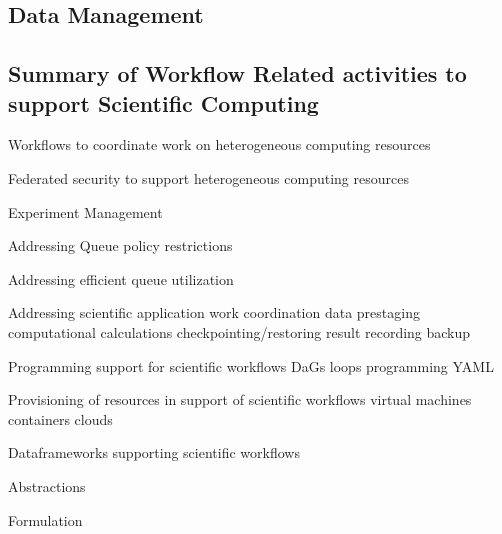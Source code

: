 \documentclass[utf8]{FrontiersinVancouver} %
\begin{document}
\subsection{Data Management}


\subsection{Summary of Workflow Related activities to support Scientific Computing}

Workflows to coordinate work on heterogeneous computing resources

Federated security to support heterogeneous computing resources

Experiment Management

Addressing  Queue policy restrictions

Addressing efficient queue utilization

Addressing scientific application work coordination
    data prestaging
    computational calculations
    checkpointing/restoring
    result recording
    backup

Programming support for scientific workflows
    DaGs
    loops
    programming
    YAML
    
Provisioning of resources in support of scientific workflows
    virtual machines
    containers
    clouds

Dataframeworks supporting scientific workflows

Abstractions

Formulation



\end{document}
